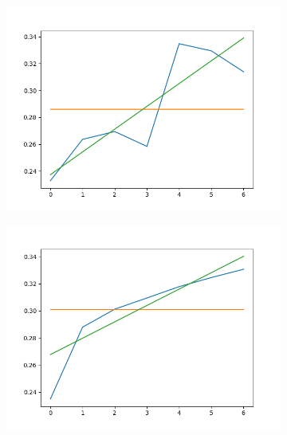 \documentclass[12pt,a4paper]{scrartcl}
\numberwithin{equation}{section}
\begin{document}
\begin{figure}[h!]
	\centering
	\begin{subfigure}{.3\textwidth}
		\centering
		\includegraphics[width=\textwidth]{lr_schedu_Falsch1}
		\caption{}
		\label{fig:Lernrate_schedulera}
	\end{subfigure}%
	\begin{subfigure}{.3\textwidth}
		\centering
		\includegraphics[width=\textwidth]{lr_schedu_Falsch2}
		\caption{}
		\label{fig:Lernrate_schedulerb}
	\end{subfigure}%
	\begin{subfigure}{.3\textwidth}
		\centering

\end{subfigure}
\end{figure}
\end{document}
